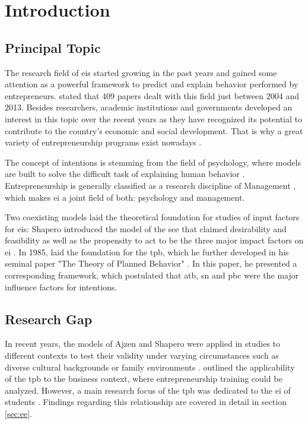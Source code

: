 \chapter{Introduction}\label{chapter:Introduction}

\renewcommand{\thepage}{\arabic{page}}
\setcounter{page}{1}

\section{Principal Topic}
The research field of \acfp{ei} started  growing in the past years and gained some attention as a powerful framework to predict and explain behavior performed by entrepreneurs. \citet{linan2015systematic} stated that 409 papers dealt with this field just between 2004 and 2013.
Besides researchers, academic institutions and governments developed an interest in this topic over the recent years as they have recognized its potential to contribute to the country's economic and social development. That is why a great variety of entrepreneurship programs exist nowadays \citep{fayolle2015impact,martin2013examining,garavan1994entrepreneurship}.

The concept of intentions is stemming from the field of psychology, where models are built to solve the difficult task of explaining human behavior \citep{ajzen1991theory}. Entrepreneurship is generally classified as a research discipline of Management \citep{shane2000promise}, which makes \ac{ei} a joint field of both: psychology and management. 

Two coexisting  models laid the theoretical foundation for studies of input factors for \acp{ei}: Shapero introduced the model of the \acf{see} that claimed desirability and feasibility as well as the propensity to act to be the three major impact factors on \ac{ei} \citep{shapero1982social,shapero1984entrepreneurial}. In 1985, \citet{ajzen1985intentions} laid the foundation for the \ac{tpb}, which he further developed in his seminal paper "The Theory of Planned Behavior" \citep{ajzen1991theory}. In this paper, he presented a corresponding framework, which postulated that \acf{atb}, \acf{sn} and \acf{pbc} were the major influence factors for intentions.

\section{Research Gap}
In recent years, the models of Ajzen and Shapero were applied in studies to different contexts to test their validity under varying circumstances such as diverse cultural backgrounds or family environments \citep{laspita2012intergenerational, linan2009development,hayton2002national,mueller2001culture}. 
\citet{krueger1993entrepreneurial} outlined the applicability of the \ac{tpb} to the business context, where entrepreneurship training could be analyzed. However, a main research focus of the \ac{tpb} was dedicated to the \acl{ei} of students \citep{fayolle2015impact}. Findings regarding this relationship are covered in detail in section \ref{sec:ee}.

